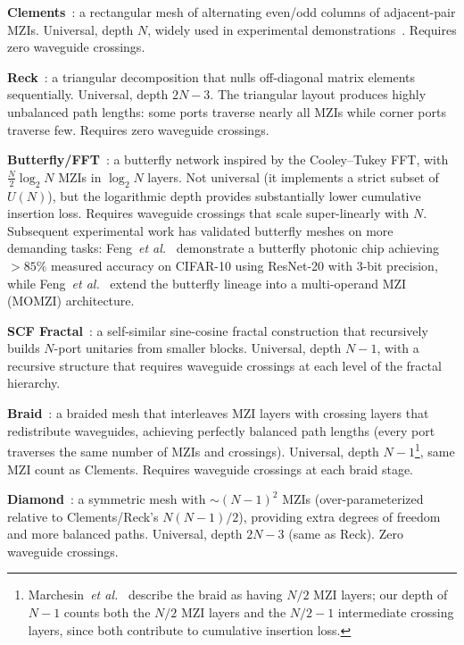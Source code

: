 \documentclass[11pt,a4paper]{article}
\begin{document}
\textbf{Clements}~\cite{clements2016}: a rectangular mesh of alternating even/odd
columns of adjacent-pair MZIs.  Universal, depth $N$, widely used in experimental
demonstrations~\cite{pai2023,shen2017}.  Requires zero waveguide crossings.

\textbf{Reck}~\cite{reck1994}: a triangular decomposition that nulls off-diagonal
matrix elements sequentially.  Universal, depth $2N{-}3$.  The triangular layout
produces highly unbalanced path lengths: some ports traverse nearly all MZIs while
corner ports traverse few.  Requires zero waveguide crossings.

\textbf{Butterfly/FFT}~\cite{tian2022,feng2022}: a butterfly network inspired by the
Cooley--Tukey FFT, with $\tfrac{N}{2}\log_2 N$ MZIs in $\log_2 N$ layers.  Not
universal (it implements a strict subset of $U(N)$), but the logarithmic depth
provides substantially lower cumulative insertion loss.  Requires waveguide crossings
that scale super-linearly with $N$.
Subsequent experimental work has validated butterfly meshes on more demanding
tasks: Feng~\textit{et al.}~\cite{feng2023resnet} demonstrate a butterfly
photonic chip achieving ${>}85\%$ measured accuracy on CIFAR-10 using ResNet-20
with 3-bit precision, while Feng~\textit{et al.}~\cite{feng2024momzi} extend
the butterfly lineage into a multi-operand MZI (MOMZI) architecture.

\textbf{SCF Fractal}~\cite{basani2023}: a self-similar sine-cosine fractal
construction that recursively builds $N$-port unitaries from smaller blocks.
Universal, depth $N{-}1$, with a recursive structure that requires waveguide
crossings at each level of the fractal hierarchy.

\textbf{Braid}~\cite{marchesin2025}: a braided mesh that interleaves MZI layers
with crossing layers that redistribute waveguides, achieving perfectly balanced
path lengths (every port traverses the same number of MZIs and crossings).
Universal, depth $N{-}1$\footnote{Marchesin~\textit{et al.}~\cite{marchesin2025}
describe the braid as having $N/2$ MZI layers; our depth of $N{-}1$ counts both
the $N/2$ MZI layers and the $N/2 - 1$ intermediate crossing layers, since both
contribute to cumulative insertion loss.}, same MZI count as Clements.  Requires
waveguide crossings at each braid stage.

\textbf{Diamond}~\cite{shokraneh2020,mojaver2023}: a symmetric mesh with
${\sim}(N{-}1)^2$ MZIs (over-parameterized relative to Clements/Reck's
$N(N{-}1)/2$), providing extra degrees of freedom and more balanced paths.
Universal, depth $2N{-}3$ (same as Reck).  Zero waveguide crossings.
\end{document}

